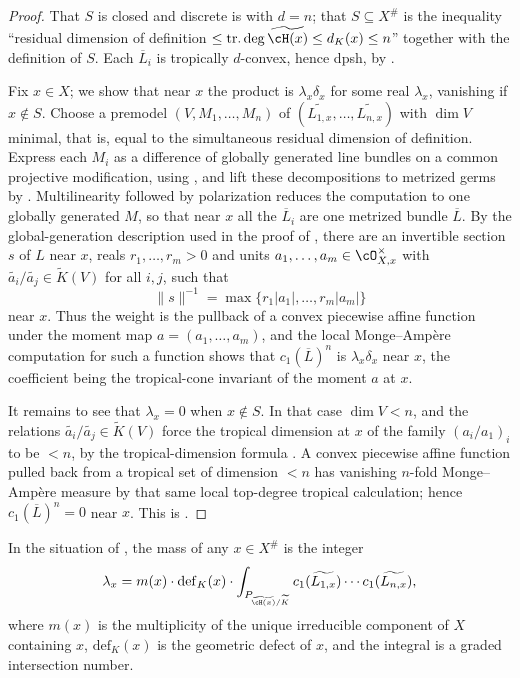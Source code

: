 \begin{proof}
That $S$ is closed and discrete is
 with $d=n$; that $S\subseteq X^{\#}$
is the inequality ``residual dimension of definition
$\le\operatorname{tr.deg}\widetilde{\cH(x)}\le d_K(x)\le n$'' together
with the definition of $S$.  Each $\overline L_i$ is tropically
$d$-convex, hence dpsh, by .

Fix $x\in X$; we show that near $x$ the product is $\lambda_x\delta_x$
for some real $\lambda_x$, vanishing if $x\notin S$.  Choose a premodel
$(V,M_1,\dots,M_n)$ of $(\widetilde{L_{1,x}},\dots,\widetilde{L_{n,x}})$
with $\dim V$ minimal, that is, equal to the simultaneous residual
dimension of definition.  Express each $M_i$ as a difference of globally
generated line bundles on a common projective modification, using
\cite[\S10.3.7]{CLD25}, and lift these decompositions to metrized germs
by \cite[Theorem~17.4.9]{CLD25}.  Multilinearity followed by
polarization reduces the computation to one globally generated $M$, so that
near $x$ all the $\overline L_i$ are one metrized bundle
$\overline L$.  By the global-generation description used in the proof of
, there are an invertible section
$s$ of $L$ near $x$, reals $r_1,\dots,r_m>0$ and units
$a_1,\dots,a_m\in\cO_{X,x}^\times$ with
$\widetilde{a_i}/\widetilde{a_j}\in\widetilde K(V)$ for all $i,j$, such
that
\[
 \|s\|^{-1}=\max\{r_1|a_1|,\dots,r_m|a_m|\}
\]
near $x$.  Thus the weight is the pullback of a convex piecewise affine
function under the moment map $a=(a_1,\dots,a_m)$, and the local
Monge--Amp\`ere computation for such a function
\cite[Proposition~8.9.4]{CLD25} shows that
$c_1(\overline L)^n$ is $\lambda_x\delta_x$ near $x$, the coefficient
being the tropical-cone invariant of the moment $a$ at $x$.

It remains to see that $\lambda_x=0$ when $x\notin S$.  In that case
$\dim V<n$, and the relations $\widetilde{a_i}/\widetilde{a_j}\in
\widetilde K(V)$ force the tropical dimension at $x$ of the family
$(a_i/a_1)_i$ to be $<n$, by the tropical-dimension formula
.  A convex piecewise affine function
pulled back from a tropical set of dimension $<n$ has vanishing $n$-fold
Monge--Amp\`ere measure by that same local top-degree tropical
calculation; hence $c_1(\overline L)^n=0$ near $x$.  This is
\cite[Proposition~18.4.3]{CLD25}.
\end{proof}

\begin{theorem}
\label{thm:ch17-atomic-masses}
In the situation of , the mass of any
$x\in X^{\#}$ is the integer
\begin{equation}
\label{eq:ch17-atomic-mass}
 \lambda_x=m(x)\cdot\mathrm{def}_K(x)\cdot
 \int_{P_{\widetilde{\cH(x)}/\widetilde K}}
   c_1(\widetilde{L_{1,x}})\cdots c_1(\widetilde{L_{n,x}}),
\end{equation}
where $m(x)$ is the multiplicity of the unique irreducible component of
$X$ containing $x$, $\mathrm{def}_K(x)$ is the geometric defect of
$x$, and the integral is a graded intersection number.
\end{theorem}

